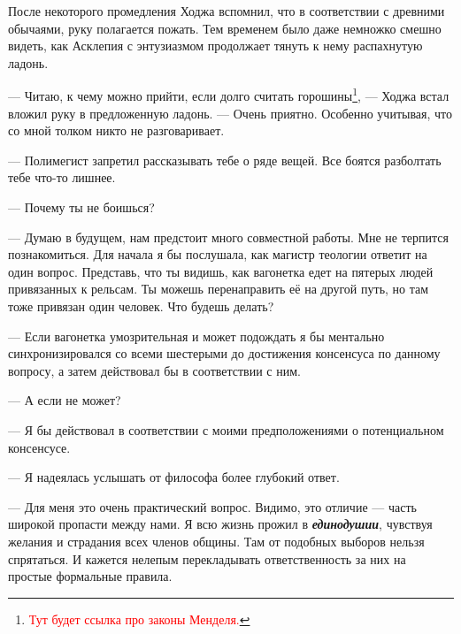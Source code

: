 \documentclass[12pt,a4paper]{article}
\newcommand{\tr}[1]{\textcolor{red}{#1}}
\begin{document}
После некоторого промедления Ходжа вспомнил, что в соответствии с древними обычаями, руку полагается пожать. Тем временем было даже немножко смешно видеть, как Асклепия с энтузиазмом продолжает тянуть к нему распахнутую ладонь.

--- Читаю, к чему можно прийти, если долго считать горошины\footnote{\tr{Тут будет ссылка про законы Менделя.}}, --- Ходжа встал вложил руку в предложенную ладонь. --- Очень приятно. Особенно учитывая, что со мной толком никто не разговаривает.

--- Полимегист запретил рассказывать тебе о ряде вещей. Все боятся разболтать тебе что-то лишнее.

--- Почему ты не боишься?

--- Думаю в будущем, нам предстоит много совместной работы. Мне не терпится познакомиться. Для начала я бы послушала, как магистр теологии ответит на один вопрос.  Представь, что ты видишь, как вагонетка едет на пятерых людей привязанных к рельсам. Ты можешь перенаправить её на другой путь, но там тоже привязан один человек. Что будешь делать?

--- Если вагонетка умозрительная и может подождать я бы ментально синхронизировался со всеми шестерыми до достижения консенсуса по данному вопросу, а затем действовал бы в соответствии с ним.

--- А если не может?

--- Я бы действовал в соответствии с моими предположениями о потенциальном консенсусе.


--- Я надеялась услышать от философа более глубокий ответ.

--- Для меня это очень практический вопрос. Видимо, это отличие --- часть широкой пропасти между нами. Я всю жизнь прожил в \textbf{\textit{единодушии}}, чувствуя желания и страдания всех членов общины. Там от подобных выборов нельзя спрятаться. И кажется нелепым перекладывать ответственность за них на простые формальные правила.

\end{document}
